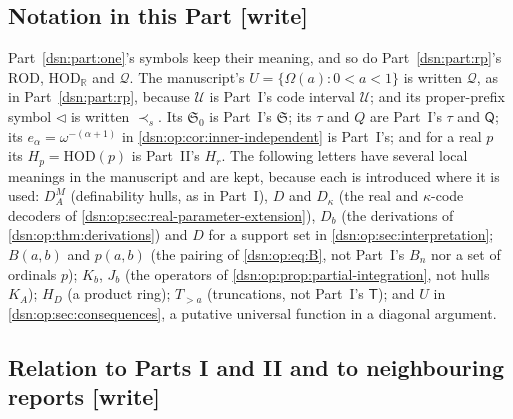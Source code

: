 \documentclass[11pt,a4paper]{article}
\numberwithin{equation}{section}
\theoremstyle{definition}
\theoremstyle{remark}
\newcommand{\HOD}{\mathrm{HOD}}
\newcommand{\R}{\mathbb R}
\newcommand{\Two}{\mathsf T}
\newcommand{\Mc}{\mathsf Q}
\newcommand{\Cell}{\mathcal U}
\newcommand{\ps}{\mathrel{\prec_s}}
\newcommand{\writetag}{\textup{\textsf{\small[write]}}}
\newcommand{\ROD}{\mathrm{ROD}}
\newcommand{\HR}{\HOD_{\R}}
\newcommand{\Qrange}{\mathcal Q}
\newcommand{\Szero}{\mathfrak S_0}
\begin{document}
\subsection{Notation in this Part \writetag}
\label{dsn:op:sub:notation}

Part~\ref{dsn:part:one}'s symbols keep their meaning, and so do
Part~\ref{dsn:part:rp}'s $\ROD$, $\HR$ and $\Qrange$. The manuscript's
$U=\{\Omega(a):0<a<1\}$ is written $\Qrange$, as in Part~\ref{dsn:part:rp},
because $\mathcal U$ is Part~I's code interval $\Cell$; and its proper-prefix
symbol $\lhd$ is written $\ps$. Its $\Szero$ is Part~I's $\mathfrak S$; its
$\tau$ and $Q$ are Part~I's $\tau$ and $\Mc$; its $e_\alpha=\omega^{-(\alpha+1)}$
in \cref{dsn:op:cor:inner-independent} is Part~I's; and for a real $p$ its
$H_p=\HOD(p)$ is Part~II's $H_r$. The following letters have several local
meanings in the manuscript and are kept, because each is introduced where it
is used: $D_A^M$ (definability hulls, as in Part~I), $D$ and $D_\kappa$ (the
real and $\kappa$-code decoders of \cref{dsn:op:sec:real-parameter-extension}),
$D_b$ (the derivations of \cref{dsn:op:thm:derivations}) and $D$ for a support
set in \cref{dsn:op:sec:interpretation}; $B(a,b)$ and $p(a,b)$ (the pairing of
\eqref{dsn:op:eq:B}, not Part~I's $B_n$ nor a set of ordinals $p$); $K_b$, $J_b$
(the operators of \cref{dsn:op:prop:partial-integration}, not hulls $K_A$);
$H_D$ (a product ring); $T_{>a}$ (truncations, not Part~I's $\Two$); and $U$ in
\cref{dsn:op:sec:consequences}, a putative universal function in a diagonal
argument.

\subsection{Relation to Parts I and II and to neighbouring reports \writetag}
\label{dsn:op:sub:relation}
\end{document}
